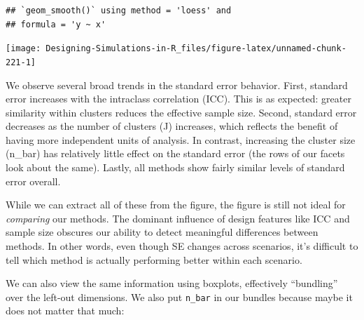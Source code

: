 \documentclass[
]{book}
\newenvironment{Shaded}{\begin{snugshade}}{\end{snugshade}}
\newcommand{\AttributeTok}[1]{\textcolor[rgb]{0.13,0.29,0.53}{#1}}
\newcommand{\ConstantTok}[1]{\textcolor[rgb]{0.56,0.35,0.01}{#1}}
\newcommand{\FloatTok}[1]{\textcolor[rgb]{0.00,0.00,0.81}{#1}}
\newcommand{\FunctionTok}[1]{\textcolor[rgb]{0.13,0.29,0.53}{\textbf{#1}}}
\newcommand{\NormalTok}[1]{#1}
\newcommand{\SpecialCharTok}[1]{\textcolor[rgb]{0.81,0.36,0.00}{\textbf{#1}}}
\begin{document}
\begin{verbatim}
## `geom_smooth()` using method = 'loess' and
## formula = 'y ~ x'
\end{verbatim}

\begin{center}\texttt{[image: Designing-Simulations-in-R\_files/figure-latex/unnamed-chunk-221-1]} \end{center}

We observe several broad trends in the standard error behavior.
First, standard error increases with the intraclass correlation (ICC).
This is as expected: greater similarity within clusters reduces the effective sample size.
Second, standard error decreases as the number of clusters (J) increases, which reflects the benefit of having more independent units of analysis.
In contrast, increasing the cluster size (n\_bar) has relatively little effect on the standard error (the rows of our facets look about the same).
Lastly, all methods show fairly similar levels of standard error overall.

While we can extract all of these from the figure, the figure is still not ideal for \emph{comparing} our methods.
The dominant influence of design features like ICC and sample size obscures our ability to detect meaningful differences between methods.
In other words, even though SE changes across scenarios, it's difficult to tell which method is actually performing better within each scenario.

We can also view the same information using boxplots, effectively ``bundling'' over the left-out dimensions.
We also put \texttt{n\_bar} in our bundles because maybe it does not matter that much:

\begin{Shaded}
\end{Shaded}
\end{document}
